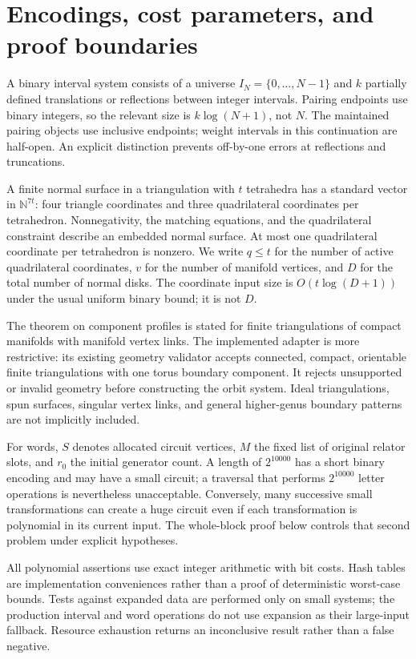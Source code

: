 \documentclass[11pt,a4paper]{article}
\theoremstyle{definition}
\theoremstyle{remark}
\newcommand{\NN}{\mathbb N}
\begin{document}
\section{Encodings, cost parameters, and proof boundaries}
\label{sec:encodings}

A binary interval system consists of a universe
$I_N=\{0,\ldots,N-1\}$ and $k$ partially defined translations or
reflections between integer intervals. Pairing endpoints use binary
integers, so the relevant size is $k\log(N+1)$, not $N$. The maintained
pairing objects use inclusive endpoints; weight intervals in this
continuation are half-open. An explicit distinction prevents off-by-one
errors at reflections and truncations.

A finite normal surface in a triangulation with $t$ tetrahedra has a
standard vector in $\NN^{7t}$: four triangle coordinates and three
quadrilateral coordinates per tetrahedron. Nonnegativity, the matching equations,
and the quadrilateral constraint describe an embedded normal surface.
At most one quadrilateral coordinate per tetrahedron is nonzero. We write
$q\le t$ for the number of active quadrilateral coordinates, $v$ for the
number of manifold vertices, and $D$ for the total number of normal disks.
The coordinate input size is $O(t\log(D+1))$ under the usual uniform
binary bound; it is not $D$.

The theorem on component profiles is stated for finite triangulations of
compact manifolds with manifold vertex links. The implemented adapter is
more restrictive: its existing geometry validator accepts connected,
compact, orientable finite triangulations with one torus boundary component.
It rejects unsupported or invalid geometry before constructing the orbit
system. Ideal triangulations, spun surfaces, singular vertex links, and
general higher-genus boundary patterns are not implicitly included.

For words, $S$ denotes allocated circuit vertices, $M$ the fixed list of
original relator slots, and $r_0$ the initial generator count. A length
of $2^{10000}$ has a short binary encoding and may have a small circuit;
a traversal that performs $2^{10000}$ letter operations is nevertheless
unacceptable. Conversely, many successive small transformations can create
a huge circuit even if each transformation is polynomial in its current
input. The whole-block proof below controls that second problem under
explicit hypotheses.

All polynomial assertions use exact integer arithmetic with bit costs.
Hash tables are implementation conveniences rather than a proof of
deterministic worst-case bounds. Tests against expanded data are performed
only on small systems; the production interval and word operations do not
use expansion as their large-input fallback. Resource exhaustion returns
an inconclusive result rather than a false negative.
\end{document}
